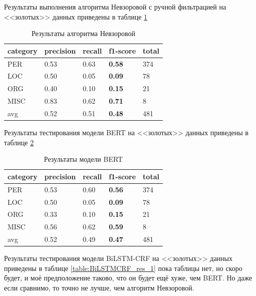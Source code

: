 Результаты выполнения алгоритма Невзоровой с ручной фильтрацией на <<золотых>> данных приведены в таблице \ref{table:Nevzorova_res_1}


\begin{table}[h!]

\begin{tabular}{| l | l | l | l | l |}
\hline


 category &precision  &  recall & \textbf{f1-score} &  total\\
 \hline
 PER& 0.53&0.63&\textbf{0.58}& 374 \\
  \hline
 LOC& 0.50&0.05&\textbf{0.09}&  78 \\
  \hline
 ORG& 0.40&0.10&\textbf{0.15}&  21 \\ 
  \hline
 MISC& 0.83&0.62&\textbf{0.71}&   8 \\ 
 \hline
 \hline

 avg& 0.52&0.51&\textbf{0.48}& 481 \\
\hline
\end{tabular}

\caption{Результаты алгоритма Невзоровой}
\label{table:Nevzorova_res_1}
\end{table}

Результаты тестирования модели BERT на <<золотых>> данных приведены в таблице \ref{table:BERT_res_1}

\begin{table}[h!]

\begin{tabular}{| l | l | l | l | l |}
\hline

 category &precision  &  recall & \textbf{f1-score} &  total\\
\hline
PER &  0.53 & 0.60 & \textbf{0.56} &  374 \\ 
\hline
LOC &  0.50 & 0.05 & \textbf{0.09} &   78 \\ 
\hline
ORG &  0.33 & 0.10 & \textbf{0.15} &   21 \\
\hline
MISC &  0.56 & 0.62 & \textbf{0.59} &   8 \\
\hline
\hline

avg &  0.52 & 0.49 & \textbf{0.47} &  481 \\
\hline
\end{tabular}

\caption{Результаты модели BERT}
\label{table:BERT_res_1}
\end{table}

Результаты тестирования модели BiLSTM-CRF на <<золотых>> данных приведены в таблице \ref{table:BiLSTMCRF_res_1} пока таблицы нет, но скоро будет, и моё предположение таково, что он будет ещё хуже, чем BERT. Но даже если сравнимо, то точно не лучше, чем алгоритм Невзоровой.


